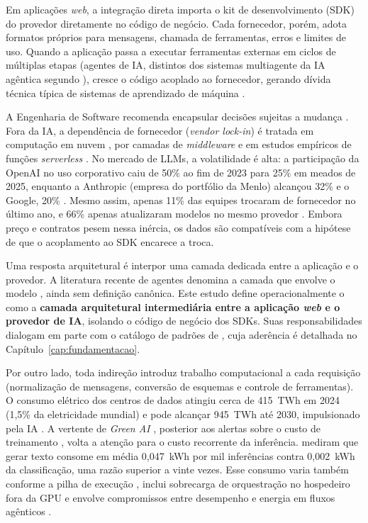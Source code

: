 Em aplicações \textit{web}, a integração direta importa o kit de
desenvolvimento (SDK) do provedor diretamente no código de negócio.
Cada fornecedor, porém, adota formatos próprios para mensagens, chamada de
ferramentas, erros e limites de uso. Quando a aplicação passa a executar
ferramentas externas em ciclos de múltiplas etapas (agentes de IA, distintos
dos sistemas multiagente da IA agêntica segundo ),
cresce o código acoplado ao fornecedor, gerando dívida técnica típica de
sistemas de aprendizado de máquina \cite{sculley2015}.

A Engenharia de Software recomenda encapsular decisões sujeitas a mudança
\cite{parnas1972,bass2021}. Fora da IA, a dependência de fornecedor
(\textit{vendor lock-in}) é tratada em computação em nuvem \cite{kaur2017},
por camadas de \textit{middleware} \cite{issarny2007} e em estudos empíricos
de funções \textit{serverless} \cite{mo2023}. No mercado de LLMs, a volatilidade
é alta: a participação da OpenAI no uso corporativo caiu de 50\% ao fim de 2023
para 25\% em meados de 2025, enquanto a Anthropic (empresa do portfólio da
Menlo) alcançou 32\% e o Google, 20\% \cite{menlo2025}. Mesmo assim, apenas
11\% das equipes trocaram de fornecedor no último ano, e 66\% apenas atualizaram
modelos no mesmo provedor \cite{menlo2025}. Embora preço e contratos pesem
nessa inércia, os dados são compatíveis com a hipótese de que o acoplamento ao
SDK encarece a troca.

Uma resposta arquitetural é interpor uma camada dedicada entre a aplicação e o
provedor. A literatura recente de agentes denomina \harness{} a camada que
envolve o modelo \cite{rafique2026}, ainda sem definição canônica. Este estudo
define operacionalmente o \harness{} como a \textbf{camada arquitetural
intermediária entre a aplicação \textit{web} e o provedor de IA}, isolando o
código de negócio dos SDKs. Suas responsabilidades dialogam em parte com o
catálogo de padrões de , cuja aderência é detalhada no
Capítulo~\ref{cap:fundamentacao}.

Por outro lado, toda indireção introduz trabalho computacional a cada
requisição (normalização de mensagens, conversão de esquemas e controle de
ferramentas). O consumo elétrico dos centros de dados atingiu cerca de 415~TWh
em 2024 (1,5\% da eletricidade mundial) e pode alcançar 945~TWh até 2030,
impulsionado pela IA \cite{iea2025}. A vertente de \textit{Green AI}
\cite{schwartz2020}, posterior aos alertas sobre o custo de treinamento
\cite{strubell2019}, volta a atenção para o custo recorrente da inferência.
 mediram que gerar texto consome em média 0,047~kWh por
mil inferências contra 0,002~kWh da classificação, uma razão superior a vinte
vezes. Esse consumo varia também conforme a pilha de execução
\cite{fernandez2025}, inclui sobrecarga de orquestração no hospedeiro fora da
GPU \cite{vellaisamy2026} e envolve compromissos entre desempenho e
energia em fluxos agênticos \cite{ifath2026}.

